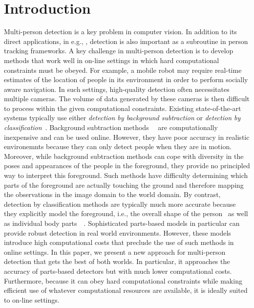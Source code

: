 \documentclass[10pt,twocolumn,letterpaper]{article}
\begin{document}
\section{Introduction}
Multi-person detection is a key problem in computer vision. In addition to its direct applications, in e.g., , detection is also important as a subroutine in person tracking  frameworks.
A key challenge in multi-person detection is to develop methods that work well in on-line settings in which hard computational constraints must be obeyed. For example, a mobile robot may require real-time estimates of the location of people in its environment in order to perform socially aware navigation. In such settings, high-quality detection often necessitates multiple cameras. The volume of data generated by these cameras is then difficult to process within the given computational constraints.
Existing state-of-the-art systems typically use either \emph{detection by background subtraction}  or \emph{detection by classification}~\cite{Pami-11}.
Background subtraction methods~\cite{bk1}~\cite{bk2-bayesian} are computationally inexpensive and can be used online. However, they have poor accuracy in realistic environemnts because they can only detect people when they are in motion.
Moreover, while background subtraction methods can cope with diversity in the poses and appearances of the people in the foreground, they provide no principled way to interpret this foreground. Such methods have difficulty determining which parts of the foreground are actually touching the ground and therefore mapping the observations in the image domain to the world domain.
By contrast, detection by classification methods are typically much more accurate because they explicitly model the foreground, i.e., the overall shape of the person~\cite{dalaltriggs} as well as individual body parts~\cite{DPM}~\cite{partsDeva}. Sophisticated parts-based models in particular can provide robust detection in real world environments. However, these models introduce high computational costs that preclude the use of such methods in online settings.
In this paper, we present a new approach for multi-person detection that gets the best of both worlds. In particular, it approaches the accuracy of parts-based detectors but with much lower computational costs. Furthermore, because it can obey hard computational constraints while making efficient use of whatever computational resources are available, it is ideally suited to on-line settings.
\end{document}
